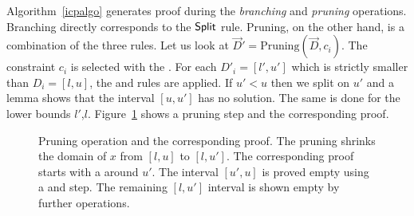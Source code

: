 Algorithm~\ref{icpalgo} generates proof during the \emph{branching} and \emph{pruning} operations.
Branching directly corresponds to the $\textsf{Split}$ rule.
Pruning, on the other hand, is a combination of the three rules.
Let us look at $\vec D' = \text{Pruning}(\vec D, c_i)$.
The constraint $c_i$ is selected with the \weaken.
For each $D'_i=[l',u']$ which is strictly smaller than $D_i=[l,u]$, the \splt and \thLem rules are applied.
If $u'<u$ then we split on $u'$ and a lemma shows that the interval $[u,u']$ has no solution.
The same is done for the lower bounds $l'$,$l$.
Figure~\ref{fig:prune} shows a pruning step and the corresponding proof.

\begin{figure}
\centering
{}
\caption{
    Pruning operation and the corresponding proof.
    The pruning shrinks the domain of $x$ from $[l,u]$ to $[l,u']$.
    The corresponding proof starts with a \splt around $u'$.
    The interval $[u',u]$ is proved empty using a \thLem and \weaken step.
    The remaining $[l,u']$ interval is shown empty by further operations.
}
\label{fig:prune}
\end{figure}
